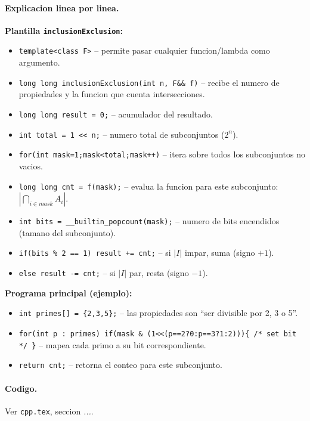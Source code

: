 \paragraph{Explicacion linea por linea.}
\textbf{Plantilla \texttt{inclusionExclusion}:}
\begin{itemize}\setlength\itemsep{0pt}
	\item \verb|template<class F>| -- permite pasar cualquier funcion/lambda como argumento.
	\item \verb|long long inclusionExclusion(int n, F&& f)| -- recibe el numero de propiedades y la funcion que cuenta intersecciones.
	\item \verb|long long result = 0;| -- acumulador del resultado.
	\item \verb|int total = 1 << n;| -- numero total de subconjuntos ($2^n$).
	\item \verb|for(int mask=1;mask<total;mask++)| -- itera sobre todos los subconjuntos no vacios.
	\item \verb|long long cnt = f(mask);| -- evalua la funcion para este subconjunto: $|\bigcap_{i \in mask} A_i|$.
	\item \verb|int bits = __builtin_popcount(mask);| -- numero de bits encendidos (tamano del subconjunto).
	\item \verb|if(bits % 2 == 1) result += cnt;| -- si $|I|$ impar, suma (signo $+1$).
	\item \verb|else result -= cnt;| -- si $|I|$ par, resta (signo $-1$).
\end{itemize}
\textbf{Programa principal (ejemplo):}
\begin{itemize}\setlength\itemsep{0pt}
	\item \verb|int primes[] = {2,3,5};| -- las propiedades son ``ser divisible por 2, 3 o 5''.
	\item \verb|for(int p : primes) if(mask & (1<<(p==2?0:p==3?1:2))){ /* set bit */ }| -- mapea cada primo a su bit correspondiente.
	\item \verb|return cnt;| -- retorna el conteo para este subconjunto.
\end{itemize}

\paragraph{Codigo.}
Ver \texttt{cpp.tex}, seccion \textit{...}.
